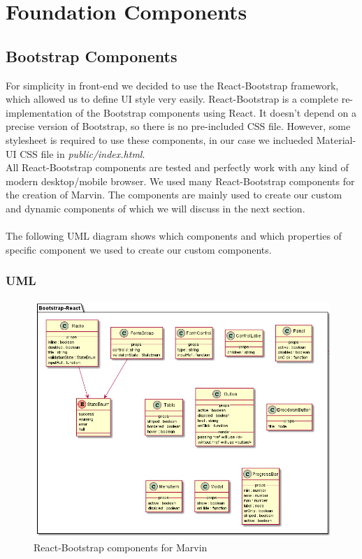 \section{Foundation Components}

	\subsection{Bootstrap Components} For simplicity in front-end we decided to use the React-Bootstrap framework, which allowed us to define UI style very easily. React-Bootstrap is a complete re-implementation of the Bootstrap components using React. It doesn't depend on a precise version of Bootstrap, so there is no pre-included CSS file. However, some stylesheet is required to use these components, in our case we inclueded Material-UI CSS file in \textit{public/index.html}. \\ All React-Bootstrap components are tested and perfectly work with any kind of modern desktop/mobile browser. We used many React-Bootstrap components for the creation of Marvin. The components are mainly used to create our custom and dynamic components 
	of which we will discuss in the next section. \\ \\ The following UML diagram shows which components and which properties of specific component we used to create our custom components. 
		\subsubsection{UML}
		\begin{figure}[h]
			\centering
			\includegraphics[width=14cm,height=9cm]{"diagrammi/react/bootstrap"}
			\caption{React-Bootstrap components for Marvin}
			\label{fig:React-Bootstrap components for Marvin}
		\end{figure}
	\newpage

